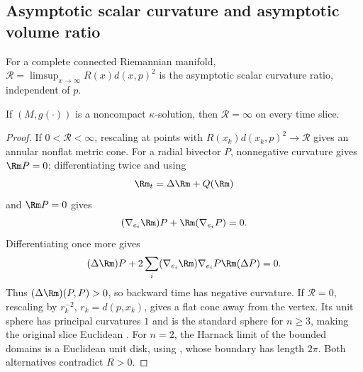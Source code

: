 \subsection{Asymptotic scalar curvature and asymptotic volume ratio}
\label{11.4proof}
\begin{definition}
\label{def:kl-asymptotic-scalar-curvature-asymptotic-volume-ratio-asymptotic-scalar-curvature-ratio-definition}

For a complete connected Riemannian manifold,
$\mathcal R=\limsup_{x\to\infty}R(x)d(x,p)^2$ is the asymptotic scalar
curvature ratio, independent of $p$.
\end{definition}
\begin{theorem}
\label{thm:kl-asymptotic-scalar-curvature-asymptotic-volume-ratio-compactness-kappa-solutions}

\label{asympscalar}
If $(M,g(\cdot))$ is a noncompact $\kappa$-solution, then $\mathcal R=\infty$
on every time slice.
\end{theorem}
\begin{proof}
\sketch If $0<\mathcal R<\infty$, rescaling at points with
$R(x_k)d(x_k,p)^2\to\mathcal R$ gives an annular nonflat metric cone.  For
a radial bivector $P$, nonnegative curvature gives $\Rm P=0$; differentiating
twice and using
\begin{equation}\label{curvevol}
\Rm_t=\Delta\Rm+Q(\Rm)
\end{equation}
and $\Rm P=0$ gives
\begin{equation}\label{diff1}
(\nabla_{e_i}\Rm)P+\Rm(\nabla_{e_i}P)=0.
\end{equation}
Differentiating once more gives
\begin{equation}\label{diff2}
(\Delta\Rm)P+2\sum_i(\nabla_{e_i}\Rm)\nabla_{e_i}P
\Rm(\Delta P)=0.
\end{equation}
Thus $(\Delta\Rm)(P,P)>0$, so backward time has negative curvature.  If
$\mathcal R=0$, rescaling by $r_k^{-2}$, $r_k=d(p,x_k)$, gives a flat cone
away from the vertex.  Its unit sphere has principal curvatures $1$ and is
the standard sphere for $n\geq3$, making the original slice Euclidean
\cite[Theorem A]{Eschenburg}.  For $n=2$, the Harnack limit of the bounded
domains is a Euclidean unit disk, using
\cite[Theorem 10.8]{Burago-Gromov-Perelman},
whose boundary has length $2\pi$.  Both alternatives contradict $R>0$.
\end{proof}
